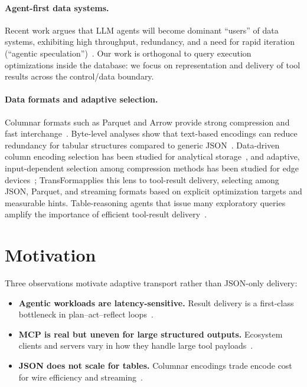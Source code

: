 \documentclass[sigconf, nonacm]{acmart}
\newcommand{\system}{TransForm}
\begin{document}
\paragraph{Agent-first data systems.}
Recent work argues that LLM agents will become dominant ``users'' of data systems, exhibiting high throughput, redundancy, and a need for rapid iteration (``agentic speculation'')~\cite{liuAgentFirstOverlords}. Our work is orthogonal to query execution optimizations inside the database: we focus on representation and delivery of tool results across the control/data boundary.

\paragraph{Data formats and adaptive selection.}
Columnar formats such as Parquet and Arrow provide strong compression and fast interchange~\cite{liuDataFormatsVldbj2025}. Byte-level analyses show that text-based encodings can reduce redundancy for tabular structures compared to generic JSON~\cite{toonVsJsonModel}. Data-driven column encoding selection has been studied for analytical storage~\cite{codecdb}, and adaptive, input-dependent selection among compression methods has been studied for edge devices~\cite{adaedge}; \system applies this lens to tool-result delivery, selecting among JSON, Parquet, and streaming formats based on explicit optimization targets and measurable hints. Table-reasoning agents that issue many exploratory queries amplify the importance of efficient tool-result delivery~\cite{tablemindWsdm2026,birdSqlNeurips2023}.

\section{Motivation}
\label{sec:motivation}

Three observations motivate adaptive transport rather than JSON-only delivery:
\begin{itemize}
  \item \textbf{Agentic workloads are latency-sensitive.} Result delivery is a first-class bottleneck in plan--act--reflect loops~\cite{liuAgentFirstOverlords}.
  \item \textbf{MCP is real but uneven for large structured outputs.} Ecosystem clients and servers vary in how they handle large tool payloads~\cite{guoMcpEcosystemMeasurement}.
  \item \textbf{JSON does not scale for tables.} Columnar encodings trade encode cost for wire efficiency and streaming~\cite{liuDataFormatsVldbj2025,toonVsJsonModel}.
\end{itemize}
\end{document}
